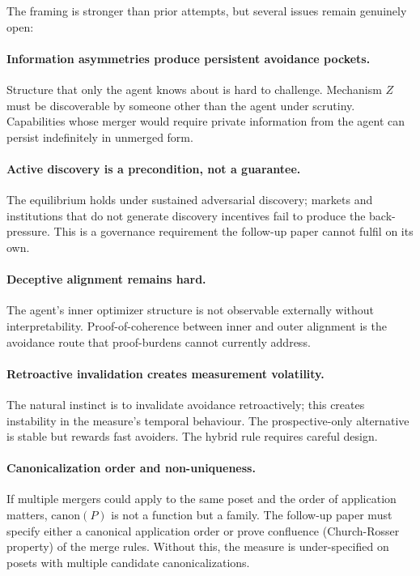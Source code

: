 \documentclass{article}
\newcommand{\canon}{\mathrm{canon}}
\begin{document}
The framing is stronger than prior attempts, but several issues
remain genuinely open:

\paragraph{Information asymmetries produce persistent avoidance
pockets.}
Structure that only the agent knows about is hard to challenge.
Mechanism $Z$ must be discoverable by someone other than the
agent under scrutiny.  Capabilities whose merger would require
private information from the agent can persist indefinitely in
unmerged form.

\paragraph{Active discovery is a precondition, not a guarantee.}
The equilibrium holds under sustained adversarial discovery;
markets and institutions that do not generate discovery
incentives fail to produce the back-pressure.  This is a
governance requirement the follow-up paper cannot fulfil on its
own.

\paragraph{Deceptive alignment remains hard.}
The agent's inner optimizer structure is not observable externally
without interpretability.  Proof-of-coherence between inner and
outer alignment is the avoidance route that proof-burdens cannot
currently address.

\paragraph{Retroactive invalidation creates measurement
volatility.}
The natural instinct is to invalidate avoidance retroactively;
this creates instability in the measure's temporal behaviour.
The prospective-only alternative is stable but rewards fast
avoiders.  The hybrid rule requires careful design.

\paragraph{Canonicalization order and non-uniqueness.}
If multiple mergers could apply to the same poset and the order
of application matters, $\canon(P)$ is not a function but a
family.  The follow-up paper must specify either a canonical
application order or prove confluence (Church-Rosser property)
of the merge rules.  Without this, the measure is under-specified
on posets with multiple candidate canonicalizations.
\end{document}
